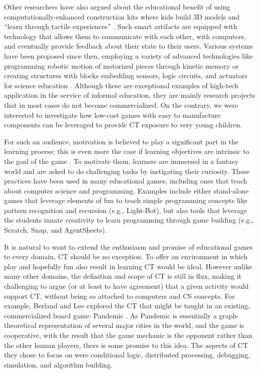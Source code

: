 \documentclass{acm_proc_article-sp}
\begin{document}
Other researchers have also argued about the educational benefit of using computationally-enhanced construction kits where kids build 3D models and ``learn through tactile experiences'' \cite{eisenberg2002computationally}. Such smart artifacts are equipped with technology that allows them to communicate with each other, with computers, and eventually provide feedback about their state to their users. Various systems have been proposed since then, employing a variety of advanced technologies like programming robotic motion of motorized pieces through kinetic memory \cite{raffle2004topobo} or creating structures with blocks embedding sensors, logic circuits, and actuators for science education \cite{schweikardt2006roblocks}. Although these are exceptional examples of high-tech application in the service of informal education, they are mainly research projects that in most cases do not become commercialized. On the contrary, we were interested to investigate how low-cost games with easy to manufacture components can be leveraged to provide CT exposure to very young children. 

For such an audience, motivation is believed to play a significant part in the learning process; this is even more the case if learning objectives are intrinsic to the goal of the game \cite{malone1987making}. To motivate them, learners are immersed in a fantasy world and are asked to do challenging tasks by instigating their curiosity. These practices have been used in many educational games, including ones that teach about computer science and programming. Examples include either stand-alone games that leverage elements of fun to teach simple programming concepts like pattern recognition and recursion (e.g., Light-Bot), but also tools that leverage the students innate creativity to learn programming through game building (e.g., Scratch, Snap, and AgentSheets).

It is natural to want to extend the enthusiasm and promise of educational games to every domain, CT should be no exception. To offer an environment in which play and hopefully fun also result in learning CT would be ideal. However unlike many other domains, the definition and scope of CT is still in flux, making it challenging to argue (or at least to have agreement) that a given activity would support CT, without being so attached to computers and CS concepts. For example, Berland and Lee explored the CT that might be taught in an existing, commercialized board game: Pandemic \cite{berland2011collaborative}. As Pandemic is essentially a graph-theoretical representation of several major cities in the world, and the game is cooperative, with the result that the game mechanic is the opponent rather than the other human players, there is some promise to this idea. The aspects of CT they chose to focus on were conditional logic, distributed processing, debugging, simulation, and algorithm building. 
\end{document}
